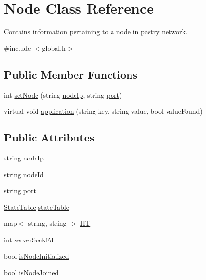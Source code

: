 \hypertarget{classNode}{\section{Node Class Reference}
\label{classNode}
}


Contains information pertaining to a node in pastry network.  




{\ttfamily \#include $<$global.\-h$>$}

\subsection*{Public Member Functions}
\begin{DoxyCompactItemize}
\item 
int \hyperlink{classNode_a805ce0a14cce97c7a2bd7f1bf4bb85b4}{set\-Node} (string \hyperlink{classNode_a59879ea3bcabb0ea5211dffcfbf49b73}{node\-Ip}, string \hyperlink{classNode_adcf35fc0482227d0b62df69b685b94da}{port})
\item 
virtual void \hyperlink{classNode_a54c977234a0fbfa21c92afcf84fd8b98}{application} (string key, string value, bool value\-Found)
\end{DoxyCompactItemize}
\subsection*{Public Attributes}
\begin{DoxyCompactItemize}
\item 
string \hyperlink{classNode_a59879ea3bcabb0ea5211dffcfbf49b73}{node\-Ip}
\item 
string \hyperlink{classNode_a709c164657057a32cc79dd7a256ed744}{node\-Id}
\item 
string \hyperlink{classNode_adcf35fc0482227d0b62df69b685b94da}{port}
\item 
\hyperlink{structStateTable}{State\-Table} \hyperlink{classNode_a22dbe41a765f7d31f43f5996d2aedb91}{state\-Table}
\item 
map$<$ string, string $>$ \hyperlink{classNode_aef05ed03e2d587ae1761c7dc4a1ad213}{H\-T}
\item 
int \hyperlink{classNode_a368d0971e95e5481cb17ce82145098bd}{server\-Sock\-Fd}
\item 
bool \hyperlink{classNode_ab125f5f050074e2dae467832069b9414}{is\-Node\-Initialized}
\item 
bool \hyperlink{classNode_ab2c5c04cb6d0bec23f4dda36dc15710b}{is\-Node\-Joined}
\end{DoxyCompactItemize}


